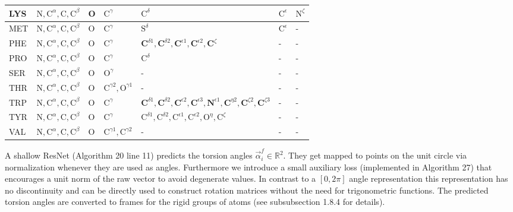 \documentclass[10pt]{article}
\begin{document}
\begin{table}[h]
\begin{center}
\begin{tabular}{|l|l|l|l|l|l|l|}
\hline
LYS & $\mathrm{N}, \mathrm{C}^{\alpha}, \mathrm{C}, \mathrm{C}^{\beta}$ & O & $\mathrm{C}^{\gamma}$ & $\mathrm{C}^{\delta}$ & $\mathrm{C}^{\epsilon}$ & $\mathrm{N}^{\zeta}$ \\
\hline
MET & $\mathrm{N}, \mathrm{C}^{\alpha}, \mathrm{C}, \mathrm{C}^{\beta}$ & O & $\mathrm{C}^{\gamma}$ & $\mathrm{S}^{\delta}$ & $\mathrm{C}^{\epsilon}$ & - \\
\hline
PHE & $\mathrm{N}, \mathrm{C}^{\alpha}, \mathrm{C}, \mathrm{C}^{\beta}$ & O & $\mathrm{C}^{\gamma}$ & $\mathbf{C}^{\delta 1}, \mathbf{C}^{\delta 2}, \mathbf{C}^{\epsilon 1}, \mathbf{C}^{\epsilon 2}, \mathbf{C}^{\zeta}$ & - & - \\
\hline
PRO & $\mathrm{N}, \mathrm{C}^{\alpha}, \mathrm{C}, \mathrm{C}^{\beta}$ & O & $\mathrm{C}^{\gamma}$ & $\mathrm{C}^{\delta}$ & - & - \\
\hline
SER & $\mathrm{N}, \mathrm{C}^{\alpha}, \mathrm{C}, \mathrm{C}^{\beta}$ & O & $\mathrm{O}^{\gamma}$ & - & - & - \\
\hline
THR & $\mathrm{N}, \mathrm{C}^{\alpha}, \mathrm{C}, \mathrm{C}^{\beta}$ & O & $\mathrm{C}^{\gamma 2}, \mathrm{O}^{\gamma 1}$ & - & - & - \\
\hline
TRP & $\mathrm{N}, \mathrm{C}^{\alpha}, \mathrm{C}, \mathrm{C}^{\beta}$ & O & $\mathrm{C}^{\gamma}$ & $\mathbf{C}^{\delta 1}, \mathbf{C}^{\delta 2}, \mathbf{C}^{\epsilon 2}, \mathbf{C}^{\epsilon 3}, \mathbf{N}^{\epsilon 1}, \mathbf{C}^{\eta 2}, \mathbf{C}^{\zeta 2}, \mathbf{C}^{\zeta 3}$ & - & - \\
\hline
TYR & $\mathrm{N}, \mathrm{C}^{\alpha}, \mathrm{C}, \mathrm{C}^{\beta}$ & O & $\mathrm{C}^{\gamma}$ & $\mathrm{C}^{\delta 1}, \mathrm{C}^{\delta 2}, \mathrm{C}^{\epsilon 1}, \mathrm{C}^{\epsilon 2}, \mathrm{O}^{\eta}, \mathrm{C}^{\zeta}$ & - & - \\
\hline
VAL & $\mathrm{N}, \mathrm{C}^{\alpha}, \mathrm{C}, \mathrm{C}^{\beta}$ & O & $\mathrm{C}^{\gamma 1}, \mathrm{C}^{\gamma 2}$ & - & - & - \\
\hline
\end{tabular}
\end{center}
\end{table}

A shallow ResNet (Algorithm 20 line 11) predicts the torsion angles $\vec{\alpha}_{i}^{f} \in \mathbb{R}^{2}$. They get mapped to points on the unit circle via normalization whenever they are used as angles. Furthermore we introduce a small auxiliary loss (implemented in Algorithm 27) that encourages a unit norm of the raw vector to avoid degenerate values. In contrast to a $[0,2 \pi]$ angle representation this representation has no discontinuity and can be directly used to construct rotation matrices without the need for trigonometric functions. The predicted torsion angles are converted to frames for the rigid groups of atoms (see subsubsection 1.8.4 for details).
\end{document}
